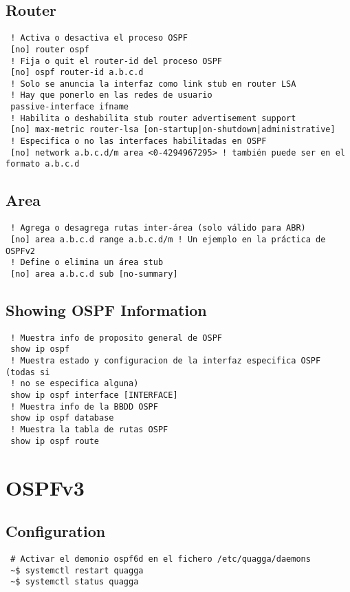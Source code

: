 \documentclass{article}
\begin{document}
\subsection{Router}
\begin{verbatim}
 ! Activa o desactiva el proceso OSPF
 [no] router ospf
 ! Fija o quit el router-id del proceso OSPF
 [no] ospf router-id a.b.c.d
 ! Solo se anuncia la interfaz como link stub en router LSA
 ! Hay que ponerlo en las redes de usuario
 passive-interface ifname
 ! Habilita o deshabilita stub router advertisement support
 [no] max-metric router-lsa [on-startup|on-shutdown|administrative]
 ! Especifica o no las interfaces habilitadas en OSPF
 [no] network a.b.c.d/m area <0-4294967295> ! también puede ser en el formato a.b.c.d
\end{verbatim}

\subsection{Area}
\begin{verbatim}
 ! Agrega o desagrega rutas inter-área (solo válido para ABR)
 [no] area a.b.c.d range a.b.c.d/m ! Un ejemplo en la práctica de OSPFv2
 ! Define o elimina un área stub
 [no] area a.b.c.d sub [no-summary] 
\end{verbatim}

\subsection{Showing OSPF Information}
\begin{verbatim}
 ! Muestra info de proposito general de OSPF
 show ip ospf
 ! Muestra estado y configuracion de la interfaz especifica OSPF (todas si
 ! no se especifica alguna)
 show ip ospf interface [INTERFACE]
 ! Muestra info de la BBDD OSPF
 show ip ospf database
 ! Muestra la tabla de rutas OSPF
 show ip ospf route
\end{verbatim}


\section{OSPFv3}
\subsection{Configuration}
\begin{verbatim}
 # Activar el demonio ospf6d en el fichero /etc/quagga/daemons
 ~$ systemctl restart quagga
 ~$ systemctl status quagga
\end{verbatim}
\end{document}
